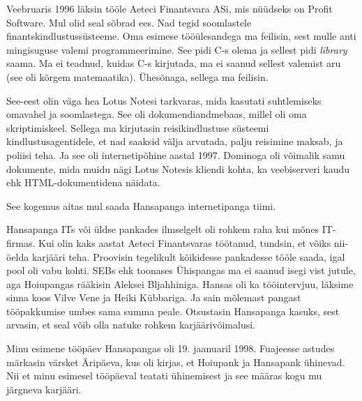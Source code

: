 
Veebruaris 1996 läksin tööle Aeteci
Finantsvara ASi, mis nüüdseks 
on Profit Software. Mul olid seal sõbrad ees. Nad tegid soomlastele 
finantskindlustussüsteeme. Oma esimese tööülesandega ma 
feilisin, sest mulle anti mingisuguse
valemi programmeerimine. See pidi C-s olema ja sellest pidi 
\emph{library} saama. Ma ei teadnud, kuidas C-s 
kirjutada, ma ei saanud sellest valemist aru (see oli kõrgem matemaatika). 
Ühesõnaga, sellega ma feilisin. 

See-eest olin väga hea Lotus 
Notesi tarkvaras, mida kasutati suhtlemiseks omavahel 
ja soomlastega. See oli dokumendiandmebaas, millel oli oma 
skriptimiskeel. Sellega ma kirjutasin reisikindlustuse süsteemi 
kindlustusagentidele, et nad saaksid välja arvutada, palju reisimine maksab, 
ja poliisi teha. Ja see oli internetipõhine aastal 1997. Dominoga 
oli võimalik samu dokumente, mida muidu nägi Lotus Notesis kliendi 
kohta, ka veebiserveri kaudu ehk HTML-dokumentidena näidata.

See kogemus aitas mul saada Hansapanga internetipanga 
tiimi.


Hansapanga ITs või üldse pankades ilmselgelt 
oli rohkem raha kui mõnes IT-firmas. Kui olin kaks aastat Aeteci
Finantsvaras töötanud, tundsin, et võiks nii-öelda karjääri teha. Proovisin tegelikult 
kõikidesse pankadesse tööle saada, igal pool oli vabu kohti. 
SEBs ehk toonases Ühispangas ma ei 
saanud isegi vist jutule, aga Hoiupangas rääkisin Aleksei 
Bljahhiniga. Hansas oli ka tööintervjuu, läksime sinna koos 
Vilve Vene ja Heiki Kübbariga. Ja sain mõlemast pangast tööpakkumise umbes sama summa peale. 
Otsustasin Hansapanga kasuks, sest arvasin, et seal võib olla natuke rohkem 
karjäärivõimalusi. 

Minu esimene tööpäev Hansapangas oli 
19. jaanuaril 1998. Fuajeesse astudes märkasin värsket 
Äripäeva, kus oli kirjas, et Hoiupank ja Hansapank ühinevad. Nii et minu 
esimesel tööpäeval teatati ühinemisest ja see määras kogu mu järgneva karjääri.



